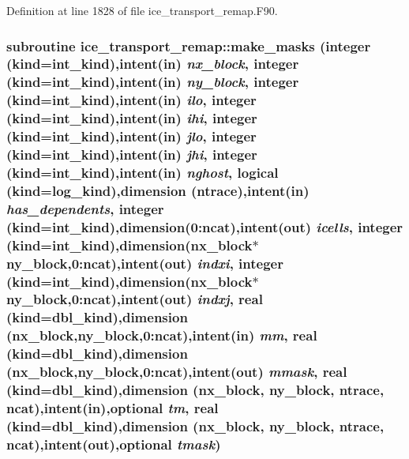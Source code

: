 Definition at line 1828 of file ice\_\-transport\_\-remap.F90.\hypertarget{namespaceice__transport__remap_a9a9fe0af7f01eed20d6df09ed2e8dc2a}{
\subsubsection[{make\_\-masks}]{\setlength{\rightskip}{0pt plus 5cm}subroutine ice\_\-transport\_\-remap::make\_\-masks (integer (kind=int\_\-kind),intent(in) {\em nx\_\-block}, \/  integer (kind=int\_\-kind),intent(in) {\em ny\_\-block}, \/  integer (kind=int\_\-kind),intent(in) {\em ilo}, \/  integer (kind=int\_\-kind),intent(in) {\em ihi}, \/  integer (kind=int\_\-kind),intent(in) {\em jlo}, \/  integer (kind=int\_\-kind),intent(in) {\em jhi}, \/  integer (kind=int\_\-kind),intent(in) {\em nghost}, \/  logical (kind=log\_\-kind),dimension (ntrace),intent(in) {\em has\_\-dependents}, \/  integer (kind=int\_\-kind),dimension(0:ncat),intent(out) {\em icells}, \/  integer (kind=int\_\-kind),dimension(nx\_\-block$\ast$ny\_\-block,0:ncat),intent(out) {\em indxi}, \/  integer (kind=int\_\-kind),dimension(nx\_\-block$\ast$ny\_\-block,0:ncat),intent(out) {\em indxj}, \/  real (kind=dbl\_\-kind),dimension (nx\_\-block,ny\_\-block,0:ncat),intent(in) {\em mm}, \/  real (kind=dbl\_\-kind),dimension (nx\_\-block,ny\_\-block,0:ncat),intent(out) {\em mmask}, \/  real (kind=dbl\_\-kind),dimension (nx\_\-block, ny\_\-block, ntrace, ncat),intent(in),optional {\em tm}, \/  real (kind=dbl\_\-kind),dimension (nx\_\-block, ny\_\-block, ntrace, ncat),intent(out),optional {\em tmask})}}
\label{namespaceice__transport__remap_a9a9fe0af7f01eed20d6df09ed2e8dc2a}


